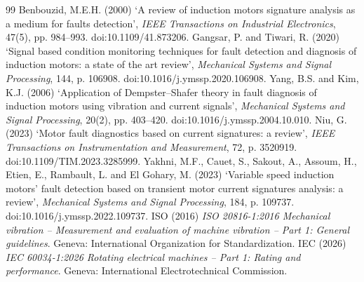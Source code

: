 \documentclass[10pt,a4paper,twocolumn]{article}
\begin{document}
\begin{footnotesize}\raggedright
\setlength{\bibsep}{0pt}
\begin{thebibliography}{99}
 Benbouzid, M.E.H. (2000) `A review of induction motors signature analysis as a medium for faults detection', \textit{IEEE Transactions on Industrial Electronics}, 47(5), pp. 984--993. doi:10.1109/41.873206.
 Gangsar, P. and Tiwari, R. (2020) `Signal based condition monitoring techniques for fault detection and diagnosis of induction motors: a state of the art review', \textit{Mechanical Systems and Signal Processing}, 144, p. 106908. doi:10.1016/j.ymssp.2020.106908.
 Yang, B.S. and Kim, K.J. (2006) `Application of Dempster--Shafer theory in fault diagnosis of induction motors using vibration and current signals', \textit{Mechanical Systems and Signal Processing}, 20(2), pp. 403--420. doi:10.1016/j.ymssp.2004.10.010.
 Niu, G. (2023) `Motor fault diagnostics based on current signatures: a review', \textit{IEEE Transactions on Instrumentation and Measurement}, 72, p. 3520919. doi:10.1109/TIM.2023.3285999.
 Yakhni, M.F., Cauet, S., Sakout, A., Assoum, H., Etien, E., Rambault, L. and El Gohary, M. (2023) `Variable speed induction motors' fault detection based on transient motor current signatures analysis: a review', \textit{Mechanical Systems and Signal Processing}, 184, p. 109737. doi:10.1016/j.ymssp.2022.109737.
 ISO (2016) \textit{ISO 20816-1:2016 Mechanical vibration -- Measurement and evaluation of machine vibration -- Part 1: General guidelines}. Geneva: International Organization for Standardization.
 IEC (2026) \textit{IEC 60034-1:2026 Rotating electrical machines -- Part 1: Rating and performance}. Geneva: International Electrotechnical Commission.
\end{thebibliography}
\end{footnotesize}
\end{document}
